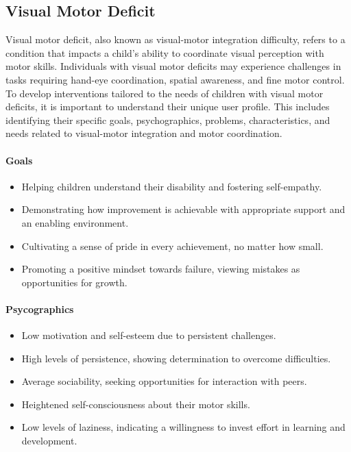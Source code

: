 \subsection{Visual Motor Deficit}
Visual motor deficit, also known as visual-motor integration difficulty, refers to a condition that impacts a child's ability to coordinate visual perception with motor skills. Individuals with visual motor deficits may experience challenges in tasks requiring hand-eye coordination, spatial awareness, and fine motor control. To develop interventions tailored to the needs of children with visual motor deficits, it is important to understand their unique user profile. This includes identifying their specific goals, psychographics, problems, characteristics, and needs related to visual-motor integration and motor coordination.

\paragraph{Goals}
\begin{itemize}
    \item Helping children understand their disability and fostering self-empathy.
    \item Demonstrating how improvement is achievable with appropriate support and an enabling environment.
    \item Cultivating a sense of pride in every achievement, no matter how small.
    \item Promoting a positive mindset towards failure, viewing mistakes as opportunities for growth.
\end{itemize}

\paragraph{Psycographics}
\begin{itemize}
    \item Low motivation and self-esteem due to persistent challenges.
    \item High levels of persistence, showing determination to overcome difficulties.
    \item Average sociability, seeking opportunities for interaction with peers.
    \item Heightened self-consciousness about their motor skills.
    \item Low levels of laziness, indicating a willingness to invest effort in learning and development.
\end{itemize}

